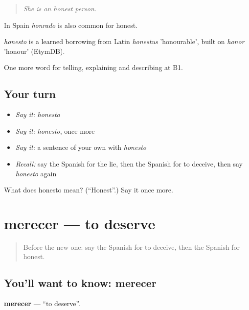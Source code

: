 \begin{quote}
\emph{She is an honest person.}
\end{quote}

In Spain \emph{honrado} is also common for honest.

\begin{cousinweb}
\emph{honesto} is a learned borrowing from Latin \emph{honestus} 'honourable', built on \emph{honor} 'honour' (EtymDB).
\end{cousinweb}

\begin{grammarlens}[title={What you've built}]
One more word for telling, explaining and describing at B1.
\end{grammarlens}

\subsection*{Your turn}
\begin{itemize}
\raggedright
  \item \emph{Say it:} \emph{honesto}
  \item \emph{Say it:} \emph{honesto}, once more
  \item \emph{Say it:} a sentence of your own with \emph{honesto}
  \item \emph{Recall:} say the Spanish for the lie, then the Spanish for to deceive, then say \emph{honesto} again
\end{itemize}

\begin{tcolorbox}[breakable,colback=teal!4,colframe=teal!35!black,title={Before you move on}]
What does honesto mean? (\textquotedblleft{}Honest\textquotedblright{}.) Say it once more.
\end{tcolorbox}
\section[merecer]{merecer — to deserve}

\label{lesson:ES-C636-merecer}



\begin{quote}
Before the new one: say the Spanish for to deceive, then the Spanish for honest.
\end{quote}

\subsection*{You'll want to know: merecer}
\textbf{merecer} — \textquotedblleft{}to deserve\textquotedblright{}.

